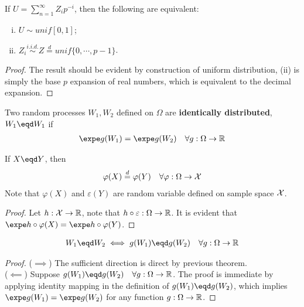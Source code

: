 \documentclass{article}
\begin{document}
   	\begin{theorem}
   		If $U = \sum_{n=1}^\infty Z_i p^{-i}$, then the following are equivalent:
   		\begin{enumerate}[(i)]
   			\item $U \sim unif[0, 1]$;
   			\item $Z_i \overset{i.i.d.}{\sim} Z \overset{d}{=} unif\{0, \cdots, p-1\}$.
   		\end{enumerate}
   	\end{theorem}
   	
   	\begin{proof}
   		The result should be evident by construction of uniform distribution, (ii) is simply the base $p$ expansion of real numbers, which is equivalent to the decimal expansion.
   	\end{proof}
   	
   	\begin{definition}
   		Two random processes $W_1, W_2$ defined on $\Omega$ are \textbf{identically distributed}, $W_1 \eqd W_1$ if 
   		\begin{align}
   			\expe g(W_1) = \expe g(W_2) \quad \forall g: \Omega \to \R
   		\end{align}
   	\end{definition}
   	
   	\begin{theorem}[Invariance I]
   		If $X \eqd Y$, then 
   		\begin{align}
   			\varphi(X) \overset{d}{=} \varphi(Y)\quad \forall \varphi: \Omega \to \mathcal{{X}}
   		\end{align}
   		Note that $\varphi(X)$ and $\varepsilon(Y)$ are random variable defined on sample space $\mathcal{{X}}$.
   	\end{theorem}
   	\begin{proof}
   		Let $h: \mathcal{{X}} \to \mathbb{R}$, note that $h \circ \varepsilon: \Omega \to \mathbb{R}$. It is evident that $\expe h \circ \varphi(X) = \expe h \circ \varphi(Y)$.
   	\end{proof}
   	
   	\begin{theorem}[Invariance II]
   		\begin{align}
   			W_1 \eqd W_2 \iff g(W_1) \eqd g(W_2)\quad \forall g: \Omega \to \R
   		\end{align}
   	\end{theorem}
   	
   	\begin{proof}
   		($\implies$) The sufficient direction is direct by previous theorem. \\
   		($\impliedby$) Suppose $g(W_1) \eqd g(W_2)\quad \forall g: \Omega \to \R$. The proof is immediate by applying identity mapping in the definition of $g(W_1) \eqd g(W_2)$, which implies $\expe g(W_1) = \expe g(W_2)$ for any function $g: \Omega \to \mathbb{R}$.
   	\end{proof}
\end{document}
